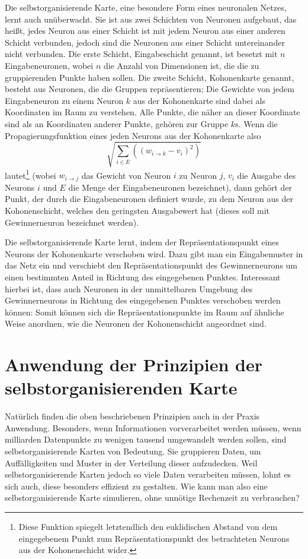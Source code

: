 \documentclass[twoside,a4paper,draft]{article}
\newcommand{\commonlettrine}[1]{\lettrine[nindent=0em,lines=2]{#1}}
\begin{document}
\commonlettrine{D}ie selbstorganisierende Karte, eine besondere Form eines neuronalen Netzes, lernt auch unüberwacht. Sie ist aus zwei Schichten von Neuronen aufgebaut, das heißt, jedes Neuron aus einer Schicht ist mit jedem Neuron aus einer anderen Schicht verbunden, jedoch sind die Neuronen aus einer Schicht untereinander nicht verbunden. Die erste Schicht, Eingabeschicht genannt, ist besetzt mit \(n\) Eingabeneuronen, wobei \(n\) die Anzahl von Dimensionen ist, die die zu gruppierenden Punkte haben sollen. Die zweite Schicht, Kohonenkarte genannt, besteht aus Neuronen, die die Gruppen repräsentieren; Die Gewichte von jedem Eingabeneuron zu einem Neuron \(k\) aus der Kohonenkarte sind dabei als Koordinaten im Raum zu verstehen. Alle Punkte, die näher an dieser Koordinate sind als an Koordinaten anderer Punkte, gehören zur Gruppe \(k\)s. Wenn die Propagierungsfunktion eines jeden Neurons aus der Kohonenkarte also
\[
\sqrt{\sum_{i\in{}E} \left((w_{i\rightarrow{}k} - v_i)^2\right)}
\]
lautet\footnote{Diese Funktion spiegelt letztendlich den euklidischen Abstand von dem eingegebenem Punkt zum Repräsentationspunkt des betrachteten Neurons aus der Kohonenschicht wider.} (wobei \(w_{i\rightarrow{}j}\) das Gewicht von Neuron \(i\) zu Neuron \(j\), \(v_i\) die Ausgabe des Neurons \(i\) und \(E\) die Menge der Eingabeneuronen bezeichnet), dann gehört der Punkt, der durch die Eingabeneuronen definiert wurde, zu dem Neuron aus der Kohonenschicht, welches den geringsten Ausgabewert hat (dieses soll mit \glqq{}Gewinnerneuron\grqq{} bezeichnet werden).

Die selbstorganisierende Karte lernt, indem der Repräsentationspunkt eines Neurons der Kohonenkarte verschoben wird. Dazu gibt man ein Eingabemuster in das Netz ein und verschiebt den Repräsentationspunkt des Gewinnerneurons um einen bestimmten Anteil in Richtung des eingegebenen Punktes. Interessant hierbei ist, dass auch Neuronen in der unmittelbaren Umgebung des Gewinnerneurons in Richtung des eingegebenen Punktes verschoben werden können: Somit können sich die Repräsentationspunkte im Raum auf ähnliche Weise anordnen, wie die Neuronen der Kohonenschicht angeordnet sind.

\section{Anwendung der Prinzipien der selbstorganisierenden Karte}

Natürlich finden die oben beschriebenen Prinzipien auch in der Praxis Anwendung. Besonders, wenn Informationen vorverarbeitet werden müssen, wenn milliarden Datenpunkte zu wenigen tausend umgewandelt werden sollen, sind selbstorganisierende Karten von Bedeutung. Sie gruppieren Daten, um Auffälligkeiten und Muster in der Verteilung dieser aufzudecken. Weil selbstorganisierende Karten jedoch so viele Daten verarbeiten müssen, lohnt es sich auch, diese besonders effizient zu gestalten. Wie kann man also eine selbstorganisierende Karte simulieren, ohne unnötige Rechenzeit zu verbrauchen?
\end{document}
